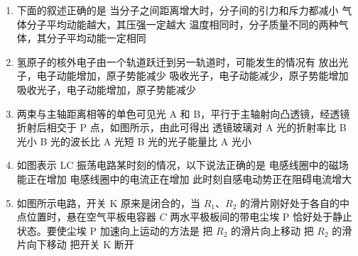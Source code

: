 \documentclass[\gkver]{gaokaozhenti}
\begin{document}
\begin{enumerate}
\item
下面的叙述正确的是
{当分子之间距离增大时，分子间的引力和斥力都减小}
{气体分子平均动能越大，其压强一定越大}
{温度相同时，分子质量不同的两种气体，其分子平均动能一定相同}

\item
氢原子的核外电子由一个轨道跃迁到另一轨道时，可能发生的情况有
{放出光子，电子动能增加，原子势能减少}
{吸收光子，电子动能减少，原子势能增加}
{吸收光子，电子动能增加，原子势能减少}

\item
两束与主轴距离相等的单色可见光 A 和 B，平行于主轴射向凸透镜，经透镜折射后相交于 P 点，如图所示，由此可得出
\onepicture{}
{透镜玻璃对 A 光的折射率比 B 光小}
{B 光的波长比 A 光短}
{B 光的光子能量比 A 光小}

\item
如图表示 LC 振荡电路某时刻的情况，以下说法正确的是
\onepicture{}
{电感线圈中的磁场能正在增加}
{电感线圈中的电流正在增加}
{此时刻自感电动势正在阻碍电流增大}

\item
如图所示电路，开关 K 原来是闭合的，当 $R_{1}$、$R_{2}$ 的滑片刚好处于各自的中点位置时，悬在空气平板电容器 $C$ 两水平极板间的带电尘埃 P 恰好处于静止状态。要使尘埃 P 加速向上运动的方法是
\onepicture{}
{把 $R_{2}$ 的滑片向上移动}
{把 $R_{2}$ 的滑片向下移动}
{把开关 K 断开}


\end{enumerate}
\end{document}
